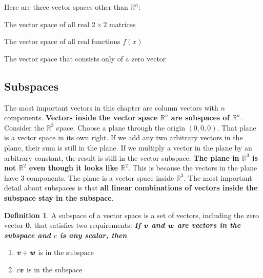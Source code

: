 \documentclass[12pt, letterpaper]{article}
\newcommand{\R}[1]{$\mathbb{R}^{#1}$}
\newcommand{\V}[1]{\textbf{\textit{#1}}}
\newcommand{\DefinitionSpace}{\vspace{15px}}
\theoremstyle{definition}
\newtheorem{definition}{Definition}[section]
\begin{document}
				\noindent Here are three vector spaces other than \R{n}:
			\begin{description}[labelindent=2\parindent]
				\item[$\mathbb{M}$] The vector space of all real $2\times2$ matrices
				\item[$\mathbb{M}$] The vector space of all real functions $f(x)$
				\item[$\mathbb{Z}$] The vector space that consists only of a zero vector
			\end{description}
			
				
\subsection{Subspaces}
	The most important vectors in this chapter are column vectors with $n$ components. \textbf{Vectors inside the vector space \R{n} are subspaces of \R{n}}. Consider the \R{3} space. Choose a plane through the origin $(0,0,0)$. That plane is a vector space in its own right. If we add any two arbitrary vectors in the plane, their sum is still in the plane. If we multiply a vector in the plane by an arbitrary constant, the result is still in the vector subspace. \textbf{The plane in \R{3} is not \R{2} even though it looks like \R{2}}. This is because the vectors in the plane have 3 components. The plane is a vector space inside \R{3}. The most important detail about subspaces is that \textbf{all linear combinations of vectors inside the subspace stay in the subspace}. 
		
		\DefinitionSpace
			\begin{definition}
				A subspace of a vector space is a set of vectors, including the zero vector \textbf{0}, that satisfies two requirements: \textbf{\textit{If $\V{v}$ and $\V{w}$ are vectors in the subspace and $c$ is any scalar, then}}
				
				\renewcommand{\theenumi}{\roman{enumi}}
				\begin{enumerate}[leftmargin=2\parindent]
					\item $\V{v}+\V{w}$ is in the subspace
					\item $c\V{v}$ is in the subspace
				\end{enumerate}	
			\end{definition} 	
		\DefinitionSpace
	
\end{document}

